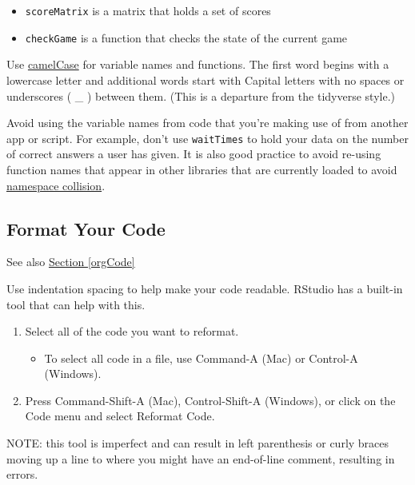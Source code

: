 \documentclass[
]{book}
\providecommand{\tightlist}{%
  \setlength{\itemsep}{0pt}\setlength{\parskip}{0pt}}
\begin{document}
\begin{itemize}
\tightlist
\item
  \texttt{scoreMatrix} is a matrix that holds a set of scores\\
\item
  \texttt{checkGame} is a function that checks the state of the current game
\end{itemize}

Use \href{https://en.wikipedia.org/wiki/Camel_case}{camelCase} for variable names and functions. The first word begins with a lowercase letter and additional words start with Capital letters with no spaces or underscores ( \_ ) between them. (This is a departure from the tidyverse style.)

Avoid using the variable names from code that you're making use of from another app or script. For example, don't use \texttt{waitTimes} to hold your data on the number of correct answers a user has given. It is also good practice to avoid re-using function names that appear in other libraries that are currently loaded to avoid \href{https://en.wikipedia.org/wiki/Naming_collision}{namespace collision}.

\hypertarget{formatCodec}{%
\subsection{Format Your Code}\label{formatCodec}}

See also \protect\hyperlink{orgCodec}{Section \ref{orgCode}}

Use indentation spacing to help make your code readable. RStudio has a built-in tool that can help with this.

\begin{enumerate}
\def\labelenumi{\arabic{enumi}.}
\tightlist
\item
  Select all of the code you want to reformat.

  \begin{itemize}
  \tightlist
  \item
    To select all code in a file, use Command-A (Mac) or Control-A (Windows).
  \end{itemize}
\item
  Press Command-Shift-A (Mac), Control-Shift-A (Windows), or click on the Code menu and select Reformat Code.
\end{enumerate}

NOTE: this tool is imperfect and can result in left parenthesis or curly braces moving up a line to where you might have an end-of-line comment, resulting in errors.
\end{document}
